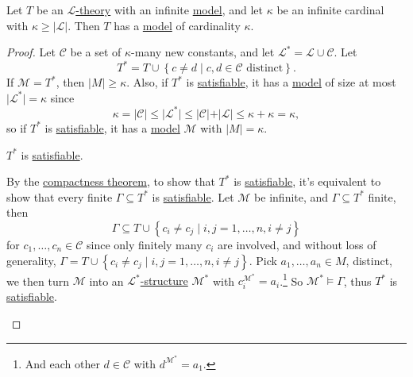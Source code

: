 \begin{proposition}
	Let \(T\) be an \hyperref[def:theory]{\(\mathcal{L}\)-theory} with an infinite \hyperref[def:model]{model}, and let \(\kappa \) be an infinite cardinal with \(\kappa \geq \vert \mathcal{L}  \vert \). Then \(T\) has a \hyperref[def:model]{model} of cardinality \(\kappa \).
\end{proposition}
\begin{proof}
	Let \(\mathcal{C} \) be a set of \(\kappa \)-many new constants, and let \(\mathcal{L} ^{\ast} = \mathcal{L} \cup \mathcal{C} \). Let
	\[
		T^{\ast} = T \cup \left\{ c \neq d \mid c, d\in \mathcal{C} \text{ distinct}  \right\} .
	\]
	If \(\mathcal{M} = T^{\ast} \), then \(\vert M \vert \geq \kappa \). Also, if \(T^{\ast} \) is \hyperref[def:satisfiable]{satisfiable}, it has a \hyperref[def:model]{model} of size at most \(\vert \mathcal{L} ^{\ast} \vert = \kappa \) since
	\[
		\kappa = \vert \mathcal{C} \vert \leq \vert \mathcal{L} ^{\ast} \vert \leq \vert \mathcal{C} \vert + \vert \mathcal{L} \vert \leq \kappa + \kappa = \kappa ,
	\]
	so if \(T^{\ast} \) is \hyperref[def:satisfiable]{satisfiable}, it has a \hyperref[def:model]{model} \(\mathcal{M} \) with \(\vert M \vert = \kappa \).

	\begin{claim}
		\(T^{\ast} \) is \hyperref[def:satisfiable]{satisfiable}.
	\end{claim}
	\begin{explanation}
		By the \hyperref[thm:compactness]{compactness theorem}, to show that \(T^{\ast} \) is \hyperref[def:satisfiable]{satisfiable}, it's equivalent to show that every finite \(\Gamma \subseteq T^{\ast} \) is \hyperref[def:satisfiable]{satisfiable}. Let \(\mathcal{M} \) be infinite, and \(\Gamma \subseteq T^{\ast} \) finite, then
		\[
			\Gamma \subseteq T \cup \left\{ c_i \neq c_j \mid i, j = 1, \ldots , n, i \neq j \right\}
		\]
		for \(c_1, \ldots , c_n\in \mathcal{C} \) since only finitely many \(c_i\) are involved, and without loss of generality, \(\Gamma = T \cup \left\{ c_i \neq c_j \mid i, j=1, \ldots , n, i \neq j \right\} \). Pick \(a_1, \ldots , a_n\in M\), distinct, we then turn \(\mathcal{M} \) into an \hyperref[def:structure]{\(\mathcal{L} ^{\ast} \)-structure} \(\mathcal{M} ^{\ast} \) with \(c_i ^{\mathcal{M} ^{\ast} } = a_i\).\footnote{And each other \(d\in \mathcal{C} \) with \(d^{\mathcal{M} ^{\ast} } = a_1\).} So \(\mathcal{M} ^{\ast} \models \Gamma \), thus \(T^{\ast} \) is \hyperref[def:satisfiable]{satisfiable}.
	\end{explanation}
\end{proof}